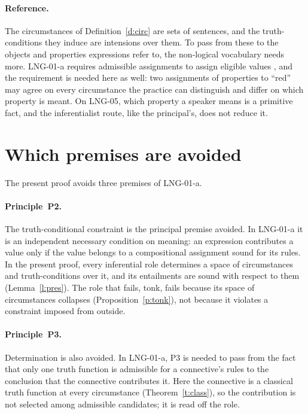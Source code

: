 \documentclass{situationist-preprint}
\begin{document}
\paragraph{Reference.} The circumstances of Definition~\ref{d:circ} are sets of sentences, and the truth-conditions they induce are intensions over them. To pass from these to the objects and properties expressions refer to, the non-logical vocabulary needs more. LNG-01-a requires admissible assignments to assign eligible values \citep{Lewis1983}, and the requirement is needed here as well: two assignments of properties to \enquote{red} may agree on every circumstance the practice can distinguish and differ on which property is meant. On LNG-05, which property a speaker means is a primitive fact, and the inferentialist route, like the principal's, does not reduce it.

\section{Which premises are avoided}\label{s:premise}

The present proof avoids three premises of LNG-01-a.

\paragraph{Principle~P2.} The truth-conditional constraint is the principal premise avoided. In LNG-01-a it is an independent necessary condition on meaning: an expression contributes a value only if the value belongs to a compositional assignment sound for its rules. In the present proof, every inferential role determines a space of circumstances and truth-conditions over it, and its entailments are sound with respect to them (Lemma~\ref{l:pres}). The role that fails, tonk, fails because its space of circumstances collapses (Proposition~\ref{p:tonk}), not because it violates a constraint imposed from outside.

\paragraph{Principle~P3.} Determination is also avoided. In LNG-01-a, P3 is needed to pass from the fact that only one truth function is admissible for a connective's rules to the conclusion that the connective contributes it. Here the connective is a classical truth function at every circumstance (Theorem~\ref{t:class}), so the contribution is not selected among admissible candidates; it is read off the role.
\end{document}
